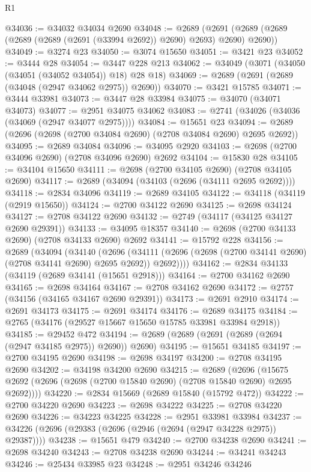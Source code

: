 \begin{lexlean}{R1}
\begin{coremodule}
@34036 := @34032 @34034 @2690
@34048 := @2689
    (@2691 (@2689 (@2689 (@2689 (@2689 (@2691 (@33994 @2692)) @2690) @2693) @2690) @2690))
@34049 := @3274 @23
@34050 := @3074 @15650
@34051 := @3421 @23
@34052 := @3444 @28
@34054 := @3447 @228 @213
@34062 := @34049 (@3071 (@34050 (@34051 (@34052 @34054)) @18) @28 @18)
@34069 := @2689 (@2691 (@2689 (@34048 (@2947 @34062 @2975)) @2690))
@34070 := @3421 @15785
@34071 := @3444 @33981
@34073 := @3447 @28 @33984
@34075 := @34070 (@34071 @34073)
@34077 := @2951 @34075 @34062
@34083 := @2741 (@34026 (@34036 (@34069 (@2947 @34077 @2975))))
@34084 := @15651 @23
@34094 := @2689 (@2696 (@2698 (@2700 @34084 @2690) (@2708 @34084 @2690) @2695 @2692))
@34095 := @2689 @34084
@34096 := @34095 @2920
@34103 := @2698 (@2700 @34096 @2690) (@2708 @34096 @2690) @2692
@34104 := @15830 @28
@34105 := @34104 @15650
@34111 := @2698 (@2700 @34105 @2690) (@2708 @34105 @2690)
@34117 := @2689 (@34094 (@34103 (@2696 (@34111 @2695 @2692))))
@34118 := @2834 @34096
@34119 := @2689 @34105
@34122 := @34118 (@34119 (@2919 @15650))
@34124 := @2700 @34122 @2690
@34125 := @2698 @34124
@34127 := @2708 @34122 @2690
@34132 := @2749 (@34117 (@34125 @34127 @2690 @29391))
@34133 := @34095 @18357
@34140 := @2698 (@2700 @34133 @2690) (@2708 @34133 @2690) @2692
@34141 := @15792 @228
@34156 := @2689
    (@34094
      (@34140
        (@2696
          (@34111 (@2696 (@2698 (@2700 @34141 @2690) (@2708 @34141 @2690) @2695 @2692)) @2692))))
@34162 := @2834 @34133 (@34119 (@2689 @34141 (@15651 @2918)))
@34164 := @2700 @34162 @2690
@34165 := @2698 @34164
@34167 := @2708 @34162 @2690
@34172 := @2757 (@34156 (@34165 @34167 @2690 @29391))
@34173 := @2691 @2910
@34174 := @2691 @34173
@34175 := @2691 @34174
@34176 := @2689 @34175
@34184 := @2765 (@34176 (@29527 @15667 @15650 @15785 @33981 @33984 @2918))
@34185 := @29452 @472
@34194 := @2689 (@2689 (@2691 (@2689 (@2694 (@2947 @34185 @2975)) @2690)) @2690)
@34195 := @15651 @34185
@34197 := @2700 @34195 @2690
@34198 := @2698 @34197
@34200 := @2708 @34195 @2690
@34202 := @34198 @34200 @2690
@34215 := @2689
    (@2696 (@15675 @2692 (@2696 (@2698 (@2700 @15840 @2690) (@2708 @15840 @2690) @2695 @2692))))
@34220 := @2834 @15669 (@2689 @15840 (@15792 @472))
@34222 := @2700 @34220 @2690
@34223 := @2698 @34222
@34225 := @2708 @34220 @2690
@34226 := @34223 @34225
@34228 := @2951 @33981 @33984
@34237 := @34226 (@2696 (@29383 (@2696 (@2946 (@2694 (@2947 @34228 @2975)) @29387))))
@34238 := @15651 @479
@34240 := @2700 @34238 @2690
@34241 := @2698 @34240
@34243 := @2708 @34238 @2690
@34244 := @34241 @34243
@34246 := @25434 @33985 @23
@34248 := @2951 @34246 @34246

\end{coremodule}
\end{lexlean}
